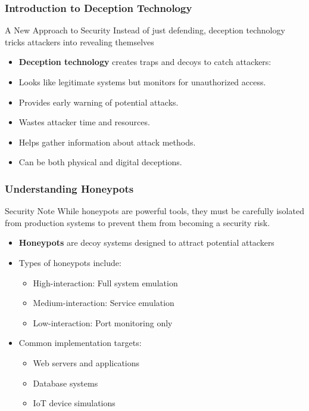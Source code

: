 \documentclass{beamer}
\begin{document}
\begin{frame}
    \frametitle{Introduction to Deception Technology}
    \begin{block}{A New Approach to Security}
        Instead of just defending, deception technology tricks attackers into revealing themselves
    \end{block}
    \begin{itemize}
        \item \textbf{Deception technology} creates traps and decoys to catch attackers:
        \item Looks like legitimate systems but monitors for unauthorized access.
        \item Provides early warning of potential attacks.
        \item Wastes attacker time and resources.
        \item Helps gather information about attack methods.
        \item Can be both physical and digital deceptions.
    \end{itemize}
\end{frame}

\begin{frame}
    \frametitle{Understanding Honeypots}
    \begin{alertblock}{Security Note}
        While honeypots are powerful tools, they must be carefully isolated from production systems to prevent them from becoming a security risk.
    \end{alertblock}
    \begin{itemize}
        \item \textbf{Honeypots} are decoy systems designed to attract potential attackers
        \item Types of honeypots include:
          \begin{itemize}
            \item High-interaction: Full system emulation
            \item Medium-interaction: Service emulation
            \item Low-interaction: Port monitoring only
          \end{itemize}
        \item Common implementation targets:
          \begin{itemize}
            \item Web servers and applications
            \item Database systems
            \item IoT device simulations
          \end{itemize}
    \end{itemize}
\end{frame}
\end{document}
